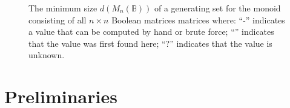 \documentclass[11pt]{article}
\numberwithin{equation}{section}
\newcommand{\B}{\mathbb{B}}
\newcommand{\Bn}{M_n(\B)}
\newcommand{\cmark}{\ding{51}}
\begin{document}
\begin{figure}
  \caption{The minimum size $d(\Bn)$ of a generating set for the monoid
  consisting of all $n \times n$ Boolean matrices matrices where: 
  ``-'' indicates a value that can be computed by hand or brute force;
  ``\cmark'' indicates that the value was first found here;
  ``?'' indicates that the value is unknown.}
\end{figure}

\section{Preliminaries}
\label{section-preliminaries}
\end{document}
